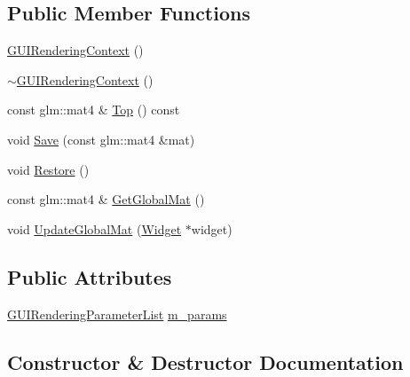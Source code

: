 \subsection*{Public Member Functions}
\begin{DoxyCompactItemize}
\item 
\mbox{\hyperlink{classngl__gui_1_1_g_u_i_rendering_context_ae9f289fcceb629044ac36ca31f539ef5}{G\+U\+I\+Rendering\+Context}} ()
\item 
\mbox{\hyperlink{classngl__gui_1_1_g_u_i_rendering_context_a5d94526a789e2d51f7d0007a7052ff71}{$\sim$\+G\+U\+I\+Rendering\+Context}} ()
\item 
const glm\+::mat4 \& \mbox{\hyperlink{classngl__gui_1_1_g_u_i_rendering_context_a3c8be8d1ee58468ebf2da08d55aeb340}{Top}} () const
\item 
void \mbox{\hyperlink{classngl__gui_1_1_g_u_i_rendering_context_a675df7cfcf7e47ebd1a855925c5e870e}{Save}} (const glm\+::mat4 \&mat)
\item 
void \mbox{\hyperlink{classngl__gui_1_1_g_u_i_rendering_context_aca19dc6c7b09be476dc7eac1c5d59798}{Restore}} ()
\item 
const glm\+::mat4 \& \mbox{\hyperlink{classngl__gui_1_1_g_u_i_rendering_context_a726b794550ac8969c6e2d160feadda63}{Get\+Global\+Mat}} ()
\item 
void \mbox{\hyperlink{classngl__gui_1_1_g_u_i_rendering_context_a97eb947aabbb15f4a816f0273bb8afd8}{Update\+Global\+Mat}} (\mbox{\hyperlink{classngl__gui_1_1_widget}{Widget}} $\ast$widget)
\end{DoxyCompactItemize}
\subsection*{Public Attributes}
\begin{DoxyCompactItemize}
\item 
\mbox{\hyperlink{structngl__gui_1_1_g_u_i_rendering_parameter_list}{G\+U\+I\+Rendering\+Parameter\+List}} \mbox{\hyperlink{classngl__gui_1_1_g_u_i_rendering_context_a6eec556788614881c0d087fd52e42b43}{m\+\_\+params}}
\end{DoxyCompactItemize}


\subsection{Constructor \& Destructor Documentation}
\mbox{\label{classngl__gui_1_1_g_u_i_rendering_context_ae9f289fcceb629044ac36ca31f539ef5}} 
